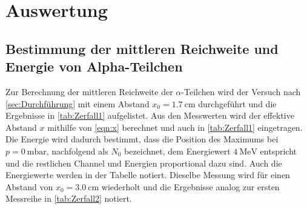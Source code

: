 \section{Auswertung}
\label{sec:Auswertung}

\subsection{Bestimmung der mittleren Reichweite und Energie von Alpha-Teilchen}
\label{sub:Reichweite}

Zur Berechnung der mittleren Reichweite der $\alpha$-Teilchen wird der Versuch nach \autoref{sec:Durchführung} 
mit einem Abstand $x_0= \qty{1.7}{\centi\meter}$ durchgeführt und die Ergebnisse
in \autoref{tab:Zerfall1} aufgelistet.
Aus den Messwerten wird der effektive Abstand $x$ mithilfe von \autoref{eqn:x} berechnet und auch in \autoref{tab:Zerfall1} eingetragen.
Die Energie wird dadurch bestimmt, dass die Position des Maximums bei $p=\qty{0}{\milli\bar}$, nachfolgend als $N_0$ bezeichnet, dem
Energiewert $\SI{4}{\mega\eV}$ entspricht und die restlichen Channel und Energien
proportional dazu sind. Auch die Energiewerte werden in der Tabelle notiert.
Dieselbe Messung wird für einen Abstand von $x_0= \qty{3.0}{\centi\meter}$ wiederholt und die Ergebnisse analog zur ersten Messreihe 
in \autoref{tab:Zerfall2} notiert.


